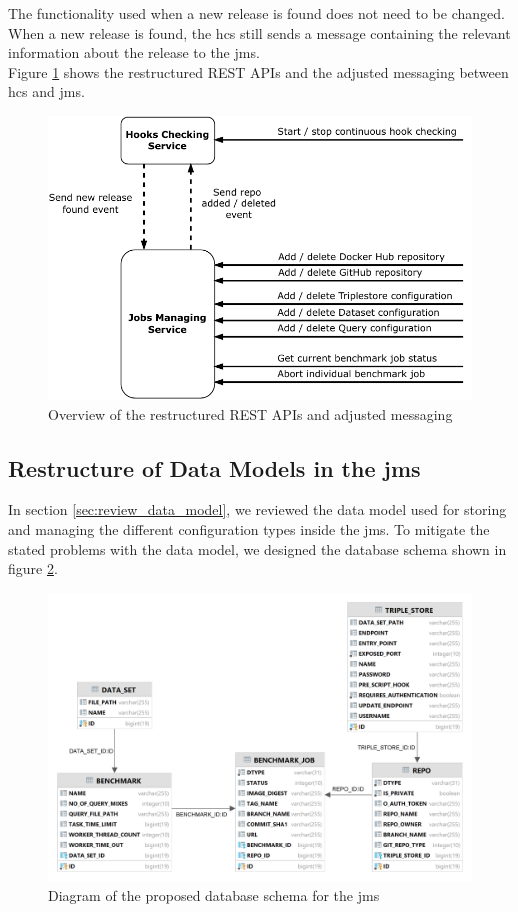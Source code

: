 The functionality used when a new release is found does not need to be changed.
When a new release is found, the \ac{hcs} still sends a message containing the relevant information about the release to the \ac{jms}.
\\

Figure \ref{fig:repo_management_restructure} shows the restructured REST APIs and the adjusted messaging between \ac{hcs} and \ac{jms}.

\begin{figure}[tbph]
	\centering
	\includegraphics[width=.65\textwidth]{figures/messaging-implementation-hcs-jms.pdf}
	\caption{Overview of the restructured REST APIs and adjusted messaging}
	\label{fig:repo_management_restructure}
\end{figure}



\subsection{Restructure of Data Models in the \acl{jms}}
\label{sec:data_model_restructure_jms}
In section \ref{sec:review_data_model}, we reviewed the data model used for storing and managing the different configuration types inside the \ac{jms}.
To mitigate the stated problems with the data model, we designed the database schema shown in figure \ref{fig:design_jms_db_schema}.

\begin{figure}[tbph]
	\centering
	\includegraphics[width=.75\textwidth]{figures/jms_db_schema_design.png}
	\caption{Diagram of the proposed database schema for the \ac{jms}}
	\label{fig:design_jms_db_schema}
\end{figure}

